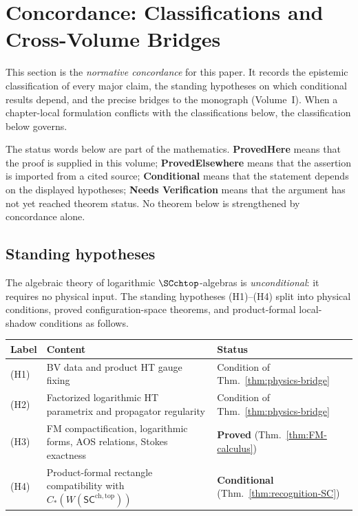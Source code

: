 
\section{Concordance: Classifications and Cross-Volume Bridges}

\begin{remark}
This section is the \emph{normative concordance} for this paper. It records the epistemic classification of every major claim, the standing hypotheses on which conditional results depend, and the precise bridges to the monograph (Volume~I). When a chapter-local formulation conflicts with the classifications below, the classification below governs.
\end{remark}

\begin{remark}
The status words below are part of the mathematics. \textbf{ProvedHere}
means that the proof is supplied in this volume; \textbf{ProvedElsewhere}
means that the assertion is imported from a cited source; \textbf{Conditional}
means that the statement depends on the displayed hypotheses; \textbf{Needs
Verification} means that the argument has not yet reached theorem status.
No theorem below is strengthened by concordance alone.
\end{remark}

\subsection{Standing hypotheses}

The algebraic theory of logarithmic $\SCchtop$-algebras is
\emph{unconditional}: it requires no physical input. The standing
hypotheses (H1)--(H4) split into physical conditions, proved
configuration-space theorems, and product-formal local-shadow
conditions as follows.

\begin{center}
\begin{tabular}{lp{}l}
\textbf{Label} & \textbf{Content} & \textbf{Status} \\
\hline
(H1) & BV data and product HT gauge fixing & Condition of Thm.~\ref{thm:physics-bridge} \\
(H2) & Factorized logarithmic HT parametrix and propagator regularity & Condition of Thm.~\ref{thm:physics-bridge} \\
(H3) & FM compactification, logarithmic forms, AOS relations, Stokes exactness & \textbf{Proved} (Thm.~\ref{thm:FM-calculus}) \\
(H4) & Product-formal rectangle compatibility with $C_\ast(W(\mathsf{SC}^{\mathrm{ch,top}}))$ & \textbf{Conditional} (Thm.~\ref{thm:recognition-SC}) \\
\end{tabular}
\end{center}

